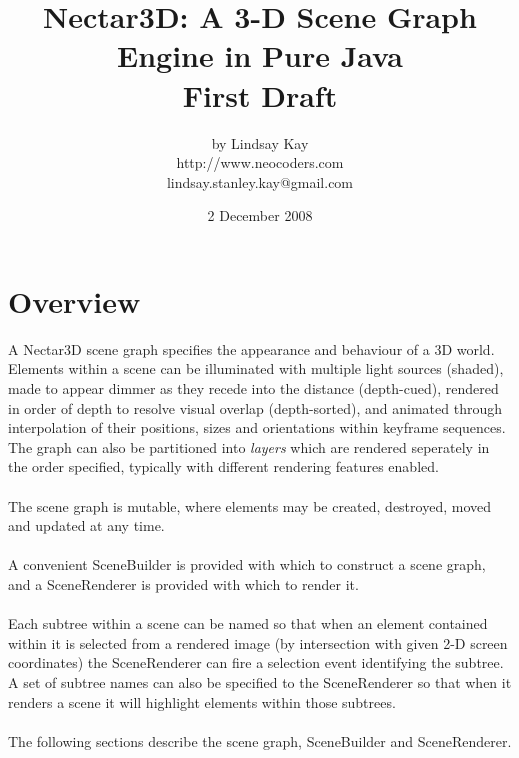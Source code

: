 \documentclass[10pt,aps, prb,preprint]{article}
\begin{document}
\title{Nectar3D: A 3-D Scene Graph Engine in Pure Java\\First Draft}
\author{by Lindsay Kay\\http://www.neocoders.com\\lindsay.stanley.kay@gmail.com}
\date{2 December 2008}
\maketitle

\newpage
\tableofcontents
\newpage
\section{Overview}


A Nectar3D scene graph specifies the appearance and behaviour of a 3D world. Elements within a scene can be illuminated with multiple light sources (shaded), made to appear dimmer as they recede into the distance (depth-cued), rendered in order of depth to resolve visual overlap (depth-sorted), and animated through interpolation of their positions, sizes and orientations within keyframe sequences.  The graph can also be partitioned into \textit{layers} which are rendered seperately in the order specified, typically with different rendering features enabled.
\\
\\
The scene graph is mutable, where elements may be created, destroyed, moved and updated at any time.
\\
\\
A convenient SceneBuilder is provided with which to construct a scene graph, and a SceneRenderer is provided with which to render it.
\\
\\
Each subtree within a scene can be named so that when an element contained within it is selected from a rendered image (by intersection with given 2-D screen coordinates) the SceneRenderer can fire a selection event identifying the subtree. A set of subtree names can also be specified to the SceneRenderer so that when it renders a scene it will highlight elements within those subtrees.
\\
\\
The following sections describe the scene graph, SceneBuilder and SceneRenderer.
\end{document}
